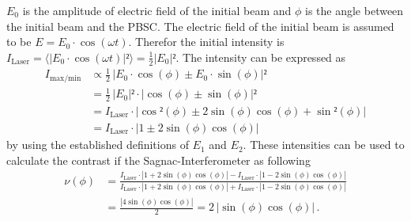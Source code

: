  $E_0$ is the amplitude of electric field of the initial beam and $\phi$ is the angle between the initial beam and the PBSC. 
 The electric field of the initial beam is assumed to be $E = E_0 \cdot \cos(\omega t)$. Therefor the initial intensity is
 $I_{\text{Laser}} = \langle |E_0 \cdot \cos(\omega t)|² \rangle = \frac{1}{2} |E_0|²$.
 The intensity can be expressed as 
 \begin{align*}
    I_{\text{max/min}} &\propto \frac{1}{2} \, |E_0 \cdot \cos(\phi) \pm E_0 \cdot \sin(\phi)|² \\
    &= \frac{1}{2} \,|E_0|² \cdot |\cos(\phi) \pm \sin(\phi)|² \\
    &= I_{\text{Laser}}  \cdot |\cos²(\phi) \pm 2\sin(\phi)\cos(\phi) + \sin²(\phi)| \\
    &= I_{\text{Laser}}  \cdot |1 \pm 2\sin(\phi)\cos(\phi)|
 \end{align*}
 by using the established definitions of $E_1$ and $E_2$. 
 These intensities can be used to calculate the contrast if the Sagnac-Interferometer as following 
 \begin{align}
    \nu(\phi) &= \frac{I_{\text{Laser}}  \cdot |1 + 2\sin(\phi)\cos(\phi)|- I_{\text{Laser}}  \cdot |1 - 2\sin(\phi)\cos(\phi)|}{I_{\text{Laser}}  \cdot |1 + 2\sin(\phi)\cos(\phi)|+ I_{\text{Laser}}  \cdot |1 - 2\sin(\phi)\cos(\phi)|} \\
    &= \frac{|4 \sin(\phi)\cos(\phi)|}{2} = 2 \, |\sin(\phi)\cos(\phi)| \, .
    \label{eqn:contrast_Sagnac}
 \end{align}

